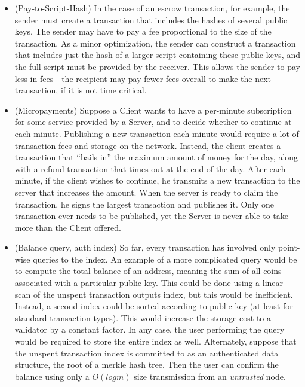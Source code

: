 \begin{itemize}
\item (Pay-to-Script-Hash) In the case of an escrow transaction, for example, the sender must create a transaction that includes the hashes of several public keys. The sender may have to pay a fee proportional to the size of the transaction. As a minor optimization, the sender can construct a transaction that includes just the hash of a larger script containing these public keys, and the full script must be provided by the receiver. This allows the sender to pay less in fees - the recipient may pay fewer fees overall to make the next transaction, if it is not time critical.
\item (Micropayments) Suppose a Client wants to have a per-minute subscription for some service provided by a Server, and to decide whether to continue at each minute. Publishing a new transaction each minute would require a lot of transaction fees and storage on the network. Instead, the client creates a transaction that ``bails in'' the maximum amount of money for the day, along with a refund transaction that times out at the end of the day. After each minute, if the client wishes to continue, he transmits a new transaction to the server that increases the amount. When the server is ready to claim the transaction, he signs the largest transaction and publishes it. Only one transaction ever needs to be published, yet the Server is never able to take more than the Client offered.
\item (Balance query, auth index) So far, every transaction has involved only point-wise queries to the index. An example of a more complicated query would be to compute the total balance of an address, meaning the sum of all coins associated with a particular public key. This could be done using a linear scan of the unspent transaction outputs index, but this would be inefficient. Instead, a second index could be sorted according to public key (at least for standard transaction types). This would increase the storage cost to a validator by a constant factor. In any case, the user performing the query would be required to store the entire index as well. Alternately, suppose that the unspent transaction index is committed to as an authenticated data structure, the root of a merkle hash tree. Then the user can confirm the balance using only a $O(log m)$ size transmission from an {\em untrusted} node.
\end{itemize}


